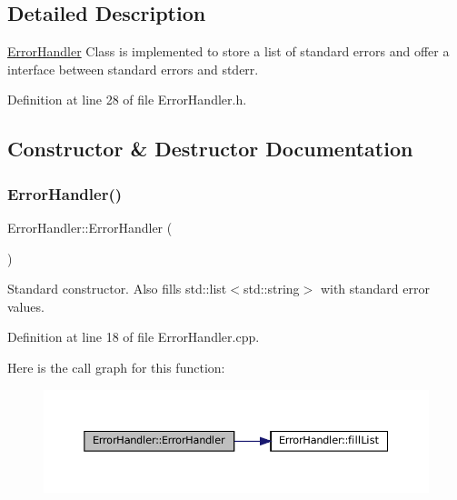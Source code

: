 \subsection{Detailed Description}
\mbox{\hyperlink{classErrorHandler}{Error\+Handler}} Class is implemented to store a list of standard errors and offer a interface between standard errors and stderr. 

Definition at line 28 of file Error\+Handler.\+h.



\subsection{Constructor \& Destructor Documentation}
\mbox{\label{classErrorHandler_a7e5f379bd231442b898cef94556b2107}} 
\subsubsection{\texorpdfstring{ErrorHandler()}{ErrorHandler()}\hspace{0.1cm}{\footnotesize\ttfamily [1/2]}}
{\footnotesize\ttfamily Error\+Handler\+::\+Error\+Handler (\begin{DoxyParamCaption}{ }\end{DoxyParamCaption})}



Standard constructor. Also fills std\+::list$<$std\+::string$>$ with standard error values. 



Definition at line 18 of file Error\+Handler.\+cpp.

Here is the call graph for this function\+:\nopagebreak
\begin{figure}[H]
\begin{center}
\leavevmode
\includegraphics[width=350pt]{classErrorHandler_a7e5f379bd231442b898cef94556b2107_cgraph}
\end{center}
\end{figure}
\mbox{\label{classErrorHandler_add20b373ee276ee2ef040f6dd913a86b}} 
